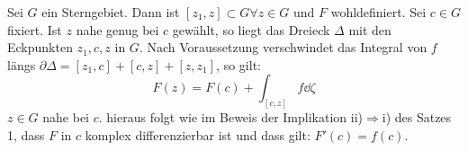 \begin{beweis}
	Sei $ G $ ein Sterngebiet. Dann ist $ [z_1,z]\subset G\forall z\in G $ und $ F $ wohldefiniert. Sei $ c\in G $ fixiert. Ist $ z $ nahe genug bei $ c $ gew\"ahlt, so liegt das Dreieck $ \Delta $ mit den Eckpunkten $ z_1,c,z $ in $ G $. Nach Voraussetzung verschwindet das Integral von $ f $ l\"angs $ \partial\Delta=[z_1,c]+[c,z]+[z,z_1] $, so gilt:
	\[ F(z)=F(c)+\int_{[c,z]}^{} f\dd\zeta \]
	$ z\in G $ nahe bei $ c $. hieraus folgt wie im Beweis der Implikation ii)$ \Rightarrow $i) des Satzes 1, dass $ F $ in $ c $ komplex differenzierbar ist und dass gilt: $ F'(c)=f(c) $.
\end{beweis}

